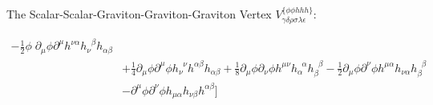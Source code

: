 \documentclass[aspectratio=169,usenames,dvipsnames]{beamer}
\begin{document}
\begin{frame}{\centering {}\\
    \small The Scalar-Scalar-Graviton-Graviton-Graviton Vertex $V_{\gamma\delta\rho\sigma\lambda\epsilon}^{\{\phi\phi h h h\}}$:}
\begin{tcolorbox}[enhanced,width=\textwidth,colframe=LUCopper,arc=4pt,boxrule=1pt,drop
  fuzzy shadow]
\begin{align*}
       - \frac{1}{2}  \phi \; \partial_{\mu} \phi \partial^{\mu} h^{\nu \alpha} h_{\nu }^{\;\;\beta}
       h_{\alpha \beta} 
\\ &    + \frac{1}{4}  \partial_{\mu}\phi \partial^{\mu} \phi h_{\nu}^{\;\;\nu}
       h^{\alpha \beta} h_{\alpha \beta} 
       + \frac{1}{8}  \partial_{\mu} \phi \partial_{\nu} \phi h^{\mu \nu} h_{\alpha}^{\;\;\alpha} h_{\beta}^{\;\;\beta}
       - \frac{1}{2}  \partial_{\mu} \phi \partial^{\nu} \phi h^{\mu \alpha}
       h_{\nu \alpha} h_{\beta}^{\;\;\beta} 
\\  &        -   \partial^{\mu} \phi \partial^{\nu} \phi h_{\mu \alpha}
       h_{\nu \beta} h^{\alpha \beta} \Bigg ]
\end{align*}
\end{tcolorbox}
\vspace{100mm}
\end{frame}
\end{document}
